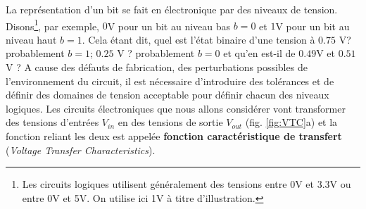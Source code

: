 La représentation d'un bit se fait en électronique par des niveaux de tension. Disons\footnote{Les circuits logiques utilisent généralement des tensions entre 0V et 3.3V ou entre 0V et 5V. On utilise ici 1V à titre d'illustration.}, par exemple, $0$V pour un bit au niveau bas $b=0$ et $1$V pour un bit au niveau haut $b=1$. Cela étant dit, quel est l'état binaire d'une tension à $0.75$ V? probablement $b=1$; $0.25$ V ? probablement $b=0$ et qu'en est-il de $0.49$V et $0.51$V ? A cause des défauts de fabrication, des perturbations possibles de l'environnement du circuit, il est nécessaire d'introduire des tolérances et de définir des domaines de tension acceptable pour définir chacun des niveaux logiques. Les circuits électroniques que nous allons considérer vont transformer des tensions d'entrées $V_{in}$ en des tensions de sortie $V_{out}$ (fig. \ref{fig:VTC}a) et la fonction reliant les deux est appelée \textbf{fonction caractéristique de transfert} (\emph{Voltage Transfer Characteristics}).

